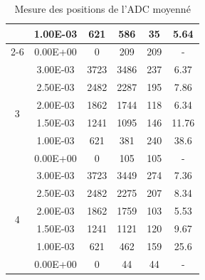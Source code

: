 \begin{table}[H]
\begin{tabular}{|c|c|c|c|c|c|}
                           & 1.00E-03         & 621       & 586     & 35     & 5.64                                                               \\ \cline{2-6}
                           & 0.00E+00         & 0         & 209     & 209    & -                                                                  \\ \hline
        \multirow{6}{*}{3} & 3.00E-03         & 3723      & 3486    & 237    & 6.37                                                               \\ \cline{2-6}
                           & 2.50E-03         & 2482      & 2287    & 195    & 7.86                                                               \\ \cline{2-6}
                           & 2.00E-03         & 1862      & 1744    & 118    & 6.34                                                               \\ \cline{2-6}
                           & 1.50E-03         & 1241      & 1095    & 146    & 11.76                                                              \\ \cline{2-6}
                           & 1.00E-03         & 621       & 381     & 240    & 38.6                                                               \\ \cline{2-6}
                           & 0.00E+00         & 0         & 105     & 105    & -                                                                  \\ \hline
        \multirow{6}{*}{4} & 3.00E-03         & 3723      & 3449    & 274    & 7.36                                                               \\ \cline{2-6}
                           & 2.50E-03         & 2482      & 2275    & 207    & 8.34                                                               \\ \cline{2-6}
                           & 2.00E-03         & 1862      & 1759    & 103    & 5.53                                                               \\ \cline{2-6}
                           & 1.50E-03         & 1241      & 1121    & 120    & 9.67                                                               \\ \cline{2-6}
                           & 1.00E-03         & 621       & 462     & 159    & 25.6                                                               \\ \cline{2-6}
                           & 0.00E+00         & 0         & 44      & 44     & -                                                                  \\ \hline
    \end{tabular}
    \caption{Mesure des positions de l'ADC moyenné}
    \label{tab:adc_brut_moyenne}
\end{table}

